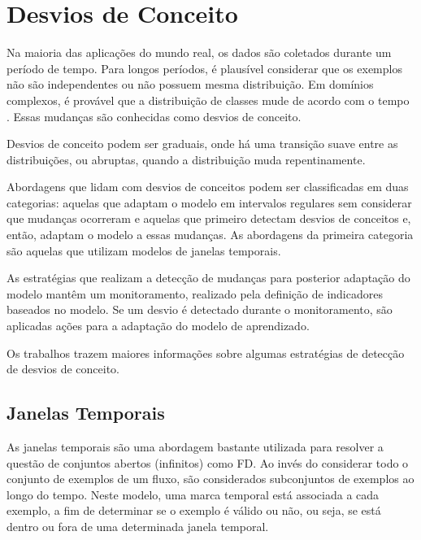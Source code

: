 
\section{Desvios de Conceito} \label{chConceitos:FD:Desvios}

Na maioria das aplicações do mundo real, os dados são coletados durante um período de tempo. Para longos períodos, é plausível considerar que os exemplos não são independentes ou não possuem mesma distribuição. Em domínios complexos, é provável que a distribuição de classes mude de acordo com o tempo \cite{Gama2004}. Essas mudanças são conhecidas como desvios de conceito.

Desvios de conceito podem ser graduais, onde há uma transição suave entre as distribuições, ou abruptas, quando a distribuição muda repentinamente.

Abordagens que lidam com desvios de conceitos podem ser classificadas em duas categorias: aquelas que adaptam o modelo em intervalos regulares sem considerar que mudanças ocorreram e aquelas que primeiro detectam desvios de conceitos e, então, adaptam o modelo a essas mudanças. As abordagens da primeira categoria são aquelas que utilizam modelos de janelas temporais.

As estratégias que realizam a detecção de mudanças para posterior adaptação do modelo mantêm um monitoramento, realizado pela definição de indicadores baseados no modelo. Se um desvio é detectado durante o monitoramento, são aplicadas ações para a adaptação do modelo de aprendizado.

Os trabalhos \cite{Gama2004,Li2012,wu2012} trazem maiores informações sobre algumas estratégias de detecção de desvios de conceito.

\subsection*{Janelas Temporais} \label{chConceitos:FD:Janelas}

As janelas temporais são uma abordagem bastante utilizada para resolver a questão de conjuntos abertos (infinitos) como FD. Ao invés do considerar todo o conjunto de exemplos de um fluxo, são considerados subconjuntos de exemplos ao longo do tempo. Neste modelo, uma marca temporal está associada a cada exemplo, a fim de determinar se o exemplo é válido ou não, ou seja, se está dentro ou fora de uma determinada janela temporal.

